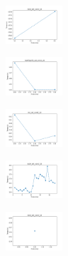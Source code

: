 \begin{figure}[H]
    \begin{subfigure}
        \centering
        \includegraphics[width=0.234\textwidth]{img/copkm/rand_set_const_10_277451237_time.png}
    \end{subfigure}
    \hfill
    \begin{subfigure}
        \centering
        \includegraphics[width=0.234\textwidth]{img/copkm/newthyroid_set_const_10_277451237_time.png}
    \end{subfigure}
    \hfill
    \begin{subfigure}
        \centering
        \includegraphics[width=0.234\textwidth]{img/copkm/iris_set_const_10_49258669_time.png}
    \end{subfigure}
    \hfill
    \begin{subfigure}
        \centering
        \includegraphics[width=0.234\textwidth]{img/copkm/ecoli_set_const_10_49258669_time.png}
    \end{subfigure}
    \hfill
    \begin{subfigure}
        \centering
        \includegraphics[width=0.234\textwidth]{img/copkm/rand_set_const_10_49258669_time.png}
    \end{subfigure}
    \hfill
    \begin{subfigure}
        \centering

\end{subfigure}
\end{figure}
